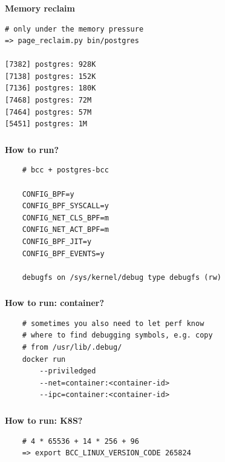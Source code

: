 \documentclass[usenames,dvipsnames, 18pt, compress, aspectratio=169]{beamer}
\begin{document}
\begin{frame}[fragile]{}
    \frametitle{}
    \begin{center}
        \textbf{Memory reclaim}

        \begin{flushleft}
        \begin{verbatim}
# only under the memory pressure
=> page_reclaim.py bin/postgres

[7382] postgres: 928K
[7138] postgres: 152K
[7136] postgres: 180K
[7468] postgres: 72M
[7464] postgres: 57M
[5451] postgres: 1M
        \end{verbatim}
        \end{flushleft}

    \end{center}
\end{frame}

\begin{frame}[fragile]{}
    \frametitle{}
    \begin{center}
        \textbf{How to run?}

		\begin{verbatim}
    # bcc + postgres-bcc

    CONFIG_BPF=y
    CONFIG_BPF_SYSCALL=y
    CONFIG_NET_CLS_BPF=m
    CONFIG_NET_ACT_BPF=m
    CONFIG_BPF_JIT=y
    CONFIG_BPF_EVENTS=y

    debugfs on /sys/kernel/debug type debugfs (rw)
        \end{verbatim}

    \end{center}
\end{frame}

\begin{frame}[fragile]{}
    \frametitle{}
    \begin{center}
        \textbf{How to run: container?}

		\begin{verbatim}
    # sometimes you also need to let perf know
    # where to find debugging symbols, e.g. copy
    # from /usr/lib/.debug/
    docker run
        --priviledged
        --net=container:<container-id>
        --ipc=container:<container-id>
        \end{verbatim}

    \end{center}
\end{frame}

\begin{frame}[fragile]{}
    \frametitle{}
    \begin{center}
        \textbf{How to run: K8S?}

		\begin{verbatim}
    # 4 * 65536 + 14 * 256 + 96
    => export BCC_LINUX_VERSION_CODE 265824
        \end{verbatim}

    \end{center}
\end{frame}
\end{document}
